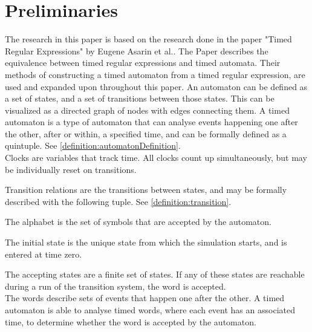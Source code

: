 \section{Preliminaries}






The research in this paper is based on the research done in the paper "Timed Regular Expressions" by Eugene Asarin et al.\cite{Eugene2001}. The Paper describes the equivalence between timed regular expressions and timed automata. Their methods of constructing a timed automaton from a timed regular expression, are used and expanded upon throughout this paper.
An automaton can be defined as a set of states, and a set of transitions between those states. This can be visualized as a directed graph of nodes with edges connecting them.
A timed automaton is a type of automaton that can analyse events happening one after the other, after or within, a specified time, and can be formally defined as a quintuple\cite{ALUR1994}. See \cref{definition:automatonDefinition}.
\\

Clocks are variables that track time. All clocks count up simultaneously, but may be individually reset on transitions.

Transition relations are the transitions between states, and may be formally described with the following tuple. See \cref{definition:transition}.

The alphabet is the set of symbols that are accepted by the automaton.

The initial state is the unique state from which the simulation starts, and is entered at time zero.

The accepting states are a finite set of states. If any of these states are reachable during a run of the transition system, the word is accepted.\\

The words describe sets of events that happen one after the other. A timed automaton is able to analyse timed words, where each event has an associated time, to determine whether the word is accepted by the automaton.

